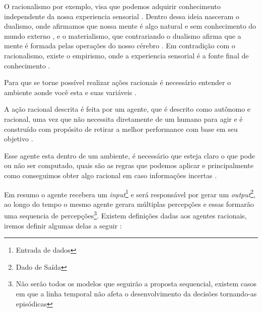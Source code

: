 
O racionalismo por exemplo, visa que podemos adquirir conhecimento independente da nossa experiencia sensorial \cite{rationalismvsempiricism}. Dentro dessa ideia nasceram o dualismo, onde afirmamos que nossa mente é algo natural e sem conhecimento do mundo externo \cite[7]{descartes2013rene}, e o materialismo, que contrariando o dualismo afirma que a mente é formada pelas operações do nosso cérebro \cite[6]{russell2003artificial}.
Em contradição com o racionalismo, existe o empirismo, onde a experiencia sensorial é a fonte final de conhecimento \cite{rationalismvsempiricism}.

Para que se torne possível realizar ações racionais é necessário entender o ambiente aonde você esta e suas variáveis \cite[99]{simon1955behavioral}.

A ação racional descrita é feita por um agente, que é descrito como autônomo e racional, uma vez que não necessita diretamente de um humano para agir e é construído com propósito de retirar a melhor performance com base em seu objetivo \cite[2]{wooldridge1994agent}.

Esse agente esta dentro de um ambiente, é necessário que esteja claro o que pode ou não ser computado, quais são as regras que podemos aplicar e principalmente como conseguimos obter algo racional em caso informações incertas \cite[7]{russell2003artificial}. 

Em resumo o agente recebera um \textit{input}\footnote{Entrada de dados} e será responsável por gerar um \textit{output}\footnote{Dado de Saída}, ao longo do tempo o mesmo agente gerara múltiplas percepções e essas formarão uma sequencia de percepções\footnote{Não serão todos os modelos que seguirão a proposta sequencial, existem casos em que a linha temporal não afeta o desenvolvimento da decisões tornando-as episódicas}. \cite[34-35]{russell2003artificial} Existem definições dadas aos agentes racionais, iremos definir algumas delas a seguir \cite[42-45]{russell2003artificial}:

